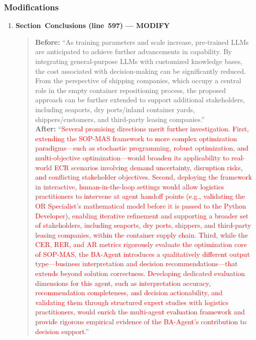\documentclass[11pt,a4paper]{article}
\begin{document}
\subsubsection{Modifications}

\begin{enumerate}
\item \textbf{Section~Conclusions (line~597) --- MODIFY}
\begin{quote}
\textbf{Before:} ``As training parameters and scale increase, pre-trained LLMs are anticipated to achieve further advancements in capability. By integrating general-purpose LLMs with customized knowledge bases, the cost associated with decision-making can be significantly reduced. From the perspective of shipping companies, which occupy a central role in the empty container repositioning process, the proposed approach can be further extended to support additional stakeholders, including seaports, dry ports/inland container yards, shippers/customers, and third-party leasing companies.''\\[4pt]
\textbf{After:} ``\textcolor{red}{Several promising directions merit further investigation. First, extending the SOP-MAS framework to more complex optimization paradigms---such as stochastic programming, robust optimization, and multi-objective optimization---would broaden its applicability to real-world ECR scenarios involving demand uncertainty, disruption risks, and conflicting stakeholder objectives. Second, deploying the framework in interactive, human-in-the-loop settings would allow logistics practitioners to intervene at agent handoff points (e.g., validating the OR Specialist's mathematical model before it is passed to the Python Developer), enabling iterative refinement and supporting a broader set of stakeholders, including seaports, dry ports, shippers, and third-party leasing companies, within the container supply chain. Third, while the CER, RER, and AR metrics rigorously evaluate the optimization core of SOP-MAS, the BA-Agent introduces a qualitatively different output type---business interpretation and decision recommendations---that extends beyond solution correctness. Developing dedicated evaluation dimensions for this agent, such as interpretation accuracy, recommendation completeness, and decision actionability, and validating them through structured expert studies with logistics practitioners, would enrich the multi-agent evaluation framework and provide rigorous empirical evidence of the BA-Agent's contribution to decision support.}''
\end{quote}
\end{enumerate}
\end{document}
